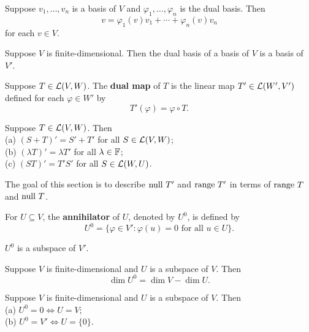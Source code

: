 \documentclass{extarticle}
\begin{document}
\begin{thm}
    Suppose \(v_1, \ldots, v_n\) is a basis of \(V\) and \(\varphi_1, \ldots, \varphi_n\)
    is the dual basis. Then 
    \[v = \varphi_1(v) v_1 + \cdots + \varphi_n(v) v_n\]
    for each \(v \in V\). 
\end{thm}

\begin{thm}
    Suppose \(V\) is finite-dimensional. Then the dual basis of a basis of \(V\) is a basis 
    of \(V'\). 
\end{thm}

\begin{definition}
    Suppose \(T \in \mathcal{L}(V, W)\). The \textbf{dual map} of \(T\) is the linear map 
    \(T' \in \mathcal{L}(W', V')\) defined for each \(\varphi \in W'\) by 
    \[T'(\varphi) = \varphi \circ T.\]
\end{definition}

\begin{corollary}
    Suppose \(T \in \mathcal{L}(V, W)\). Then \\ 
    (a) \((S + T)' = S' + T'\) for all \(S \in \mathcal{L}(V, W)\); \\ 
    (b) \((\lambda T)' = \lambda T'\) for all \(\lambda \in \mathbb{F}\); \\ 
    (c) \((ST)' = T'S'\) for all \(S \in \mathcal{L}(W, U)\). 
\end{corollary}

The goal of this section is to describe \(\text{null } T'\) and \(\text{range } T'\) in terms of 
\(\text{range } T\) and \(\text{null } T\). 

\begin{definition}[annihilator, \(U^0\)]
    For \(U \subseteq V\), the \textbf{annihilator} of \(U\), denoted by \(U^0\), is 
    defined by 
    \[U^0 = \{\varphi \in V' \colon \varphi(u) = 0 \text{ for all } u \in U\}.\]
\end{definition}

\begin{remark}
    \(U^0\) is a subspace of \(V'\). 
\end{remark}

\begin{thm}
    Suppose \(V\) is finite-dimensional and \(U\) is a subspace of \(V\). Then 
    \[\dim U^0 = \dim V - \dim U.\]
\end{thm}

\begin{lemma}
    Suppose \(V\) is finite-dimensional and \(U\) is a subspace of \(V\). Then \\ 
    (a) \(U^0 = 0 \Longleftrightarrow U = V\); \\ 
    (b) \(U^0 = V' \Longleftrightarrow U = \{0\}\). 
\end{lemma}
\end{document}
